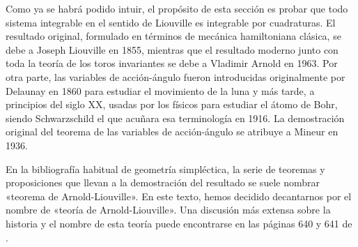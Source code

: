 Como ya se habrá podido intuir, el propósito de esta sección es probar que todo sistema integrable en el sentido de Liouville es integrable por cuadraturas. El resultado original, formulado en términos de mecánica hamiltoniana clásica, se debe a Joseph Liouville en 1855, mientras que el resultado moderno junto con toda la teoría de los toros invariantes se debe a Vladimir Arnold en 1963. Por otra parte, las variables de acción-ángulo fueron introducidas originalmente por Delaunay en 1860 para estudiar el movimiento de la luna y más tarde, a principios del siglo XX, usadas por los físicos para estudiar el átomo de Bohr, siendo Schwarzschild el que acuñara esa terminología en 1916. La demostración original del teorema de las variables de acción-ángulo se atribuye a Mineur en 1936. 

En la bibliografía habitual de geometría simpléctica, la serie de teoremas y proposiciones que llevan a la demostración del resultado se suele nombrar «teorema de Arnold-Liouville». En este texto, hemos decidido decantarnos por el nombre de «teoría de Arnold-Liouville». Una discusión más extensa sobre la historia y el nombre de esta teoría puede encontrarse en las páginas 640 y 641 de \cite{spivak}.

